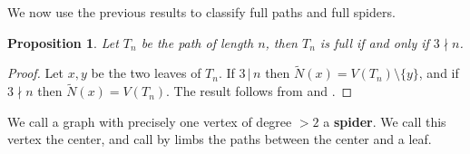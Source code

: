 \documentclass[dvipsnames,10pt]{article}
\newtheorem{proposition}[theorem]{Proposition}
\begin{document}
We now use the previous results to classify full paths and full spiders.

\begin{proposition}
    Let $T_n$ be the path of length $n$, then $T_n$ is full if and only if $3\nmid n$.
\end{proposition}

\begin{proof}
    Let $x,y$ be the two leaves of $T_n$. If $3\,|\,n$ then $\tilde{N}(x)=V(T_n)\setminus \{y\}$, and if $3\nmid n$ then $\tilde{N}(x)=V(T_n)$. The result follows from  and .
\end{proof}

We call a graph with precisely one vertex of degree $>2$ a \textbf{spider}. We call this vertex the center, and call by limbs the paths between the center and a leaf.
\end{document}

